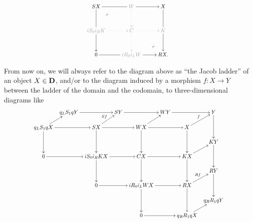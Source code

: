 \[\label{normalite}
	\scalebox{.8}{\xymatrix@!R=7mm{
	                SX	& \gray{W}	& X \\
	                \gray{iS_0 i_RK}	& \gray{C}	& \gray{K} \\
	                0	& \gray{i R_0 i_L W}	& RX.
	                \ar@{}|(.3)\lrcorner "1,1";"2,2" 
	                \ar@{-} "1,1";"1,2" 
	                \ar@{-} "1,1";"2,1" 
	                \ar "1,2";"1,3" 
	                \ar@{.>}@[semilightgray] "1,2";"2,2" 
	                \ar@{-} "1,3";"2,3" 
	                \ar@{.>}@[semilightgray] "2,1";"2,2" 
	                \ar "2,1";"3,1" 
	                \ar@{.>}@[semilightgray] "2,2";"2,3" 
	                \ar@{.>}@[semilightgray] "2,2";"3,2" 
	                \ar "2,3";"3,3" 
	                \ar@{-} "3,1";"3,2" 
	                \ar "3,2";"3,3" 
	                \ar@{}|(.3)\ulcorner "3,3";"2,2" 
	              }}
\]\begin{notat}
From now on, we will always refer to the diagram above as ``the Jacob ladder'' of an object $X\in\mathbf{D}$, and\fshyp{}or to the diagram induced by a morphism $f\colon X\to Y$ between the ladder of the domain and the codomain, \ie to three\hyp{}dimensional diagrams like
\[\label{functorial.ladder}
\scalebox{.8}{ 
\xymatrix@R=4.5mm@C=2mm{
  	& q_L S_1 q Y	& 	& \textcolor{black}{SY}	& 	& WY	& 	& \textcolor{black}{Y} \\
  q_L S_1 qX	& 	& \textcolor{black}{SX}	& 	& WX	& 	& \textcolor{black}{X} \\
  	& 	& 	& 	& 	& 	& 	& KY \\
  0	& 	& i S_0 i_R KX	& 	& CX	& 	& KX \\
  	& 	& 	& 	& 	& 	& 	& \textcolor{black}{RY} \\
  	& 	& 0	& 	& i R_0 i_L WX	& 	& \textcolor{black}{RX} \\
  	& 	& 	& 	& 	& 	& 	& q_R R_1 qY \\
  	& 	& 	& 	& 0	& 	& q_R R_1 qX
  \ar "1,2";"1,4" 
  \ar "1,4";"1,6" 
  \ar "1,6";"1,8" 
  \ar "1,8";"3,8" 
  \ar "2,1";"1,2" 
  \ar "2,1";"2,3" 
  \ar "2,1";"4,1" 
  \ar "2,3";"1,4" ^{Sf}
  \ar "2,3";"2,5" 
  \ar "2,3";"4,3" 
  \ar "2,5";"1,6" 
  \ar "2,5";"2,7" 
  \ar "2,5";"4,5" 
  \ar "2,7";"4,7" 
  \ar^f "2,7";"1,8" 
  \ar "3,8";"5,8" 
  \ar "4,1";"4,3" 
  \ar "4,3";"6,3" 
  \ar "4,3";"4,5" 
  \ar "4,5";"6,5" 
  \ar "4,5";"4,7" 
  \ar "4,7";"6,7" 
  \ar "4,7";"3,8" 
  \ar "5,8";"7,8" 
  \ar "6,3";"6,5" 
  \ar "6,5";"6,7" 
  \ar "6,5";"8,5" 
  \ar "6,7";"8,7" 
  \ar "6,7";"5,8" ^{Rf}
  \ar "8,5";"8,7" 
  \ar "8,7";"7,8" 
}}
\]
\end{notat}
